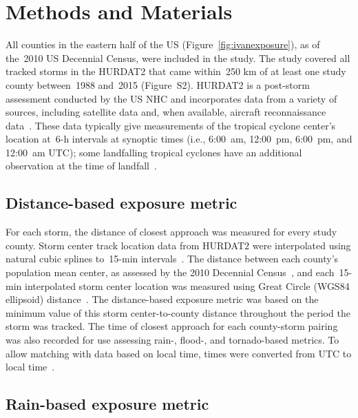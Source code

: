 \section*{Methods and Materials}

All counties in the eastern half of the \ac{US}
(Figure~\ref{fig:ivanexposure}), as of the~2010 \ac{US} Decennial Census, were
included in the study. The study covered all tracked storms in the \ac{HURDAT2}
\parencite{landsea2013} that came within~250 \si{\kilo\metre} of at least one
study county between~1988 and~2015 (Figure~S2).
\ac{HURDAT2} is a post-storm assessment conducted by the \ac{US} \ac{NHC} and
incorporates data from a variety of sources, including satellite data and, when
available, aircraft reconnaissance data~\parencite{landsea2013, jarvinen1988}.
These data typically give measurements of the tropical cyclone center's
location at~6-\si{\hour} intervals at synoptic times (i.e., 6:00~am, 12:00~pm,
6:00~pm, and 12:00~am \ac{UTC}); some landfalling tropical cyclones have an
additional observation at the time of landfall~\parencite{landsea2013}.

\subsection*{Distance-based exposure metric}

For each storm, the distance of closest approach was measured for every study
county.  Storm center track location data from \ac{HURDAT2} were interpolated
using natural cubic splines to~15-\si{\minute} intervals~\parencite{hurricaneexposure}.
The distance between each county's population mean center, as assessed by the
2010 Decennial Census~\parencite{countycenters}, and each~15-\si{\minute} interpolated
storm center location was measured using Great Circle (WGS84 ellipsoid)
distance~\parencite{bivand2013applied}. The distance-based exposure metric was
based on the minimum value of this storm center-to-county distance throughout
the period the storm was tracked. The time of closest approach for each
county-storm pairing was also recorded for use assessing rain-, flood-, and
tornado-based metrics. To allow matching with data based on local time, times
were converted from \ac{UTC} to local time~\parencite{countytimezones}.

\subsection*{Rain-based exposure metric}


